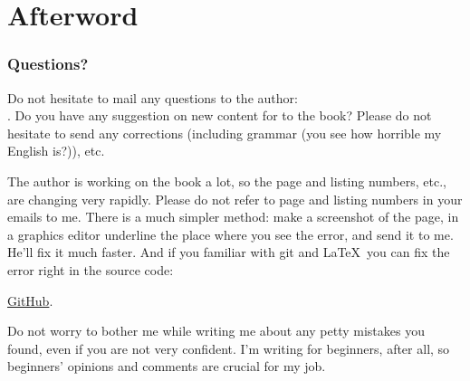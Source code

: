 \part*{Afterword}

\section{Questions?}

Do not hesitate to mail any questions to the author: \\
\GTT{<\EMAIL>}.
Do you have any suggestion on new content for to the book?
Please do not hesitate to send any corrections (including grammar (you see how horrible my English is?)), etc.

The author is working on the book a lot, so the page and listing numbers, etc., are changing very rapidly.
Please do not refer to page and listing numbers in your emails to me.
There is a much simpler method: make a screenshot of the page, in a graphics editor underline the place where you see the error,
and send it to me. He'll fix it much faster.
And if you familiar with git and \LaTeX\, you can fix the error right in the source code: 

\href{http://go.yurichev.com/17089}{GitHub}.

Do not worry to bother me while writing me about any petty mistakes you found, even if you are not very confident.
I'm writing for beginners, after all, so beginners' opinions and comments are crucial for my job.
